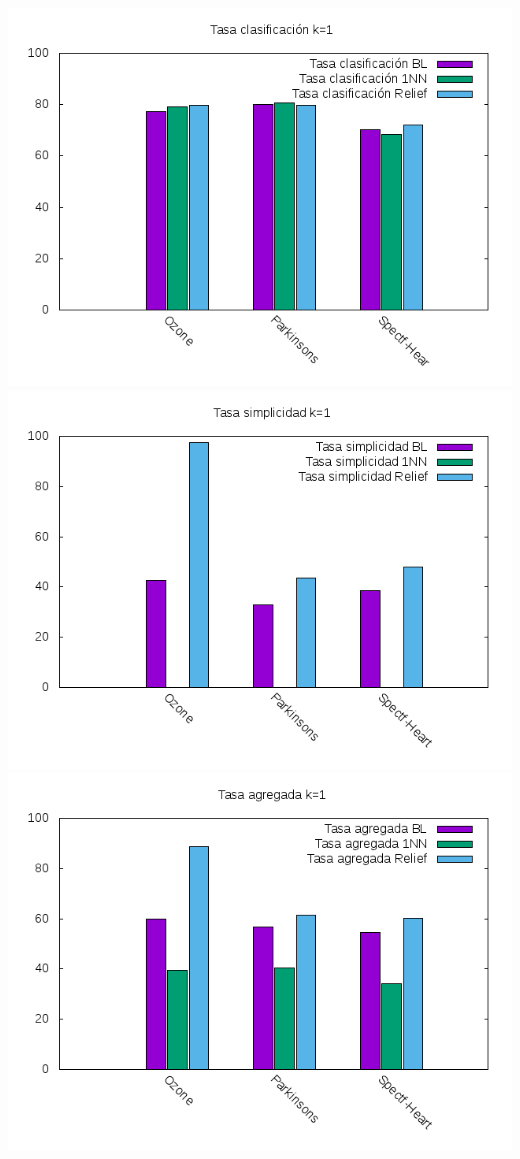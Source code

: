 \documentclass[12pt,a4paper]{article}
\begin{document}
	\includegraphics*[scale=1]{./Imagenes/K1/tasa_clas.png}
	\newline
	\includegraphics*[scale=1]{./Imagenes/K1/tasa_simpl.png}
	\newline
	\includegraphics*[scale=1]{./Imagenes/K1/tasa_agr.png}
\end{document}
